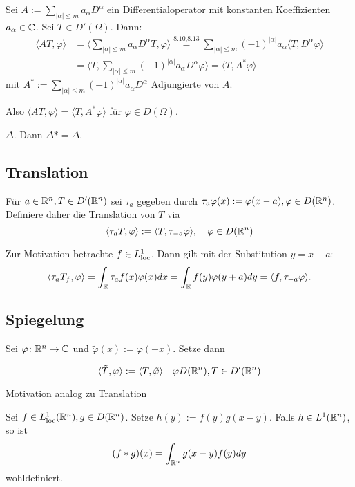 Sei $A := \sum_{|\alpha| \leq m} a_\alpha D^\alpha$ ein Differentialoperator mit konstanten Koeffizienten $a_\alpha \in \mathbb{C}$.
Sei $T \in D'(\Omega)$. Dann:
\begin{align*}
  \langle AT, \varphi \rangle
  &= \langle \sum_{|\alpha| \leq m} a_\alpha D^\alpha T, \varphi \rangle
  \overset{\text{8.10,8.13}}{=} \sum_{|\alpha| \leq m} (-1)^{|\alpha|} a_\alpha \langle T, D^\alpha \varphi \rangle \\
  &= \langle T, \sum_{|\alpha| \leq m} (-1)^{|\alpha|} a_\alpha D^\alpha \varphi \rangle 
  = \langle T, A^* \varphi \rangle
\end{align*}
mit $A^* := \sum_{|\alpha| \leq m} (-1)^{|\alpha|} a_\alpha D^\alpha$ \underline{Adjungierte von $A$}.

Also $\langle AT, \varphi \rangle = \langle T, A^* \varphi \rangle$ für $\varphi \in D(\Omega)$.

\begin{ex}
  $\Delta$. Dann $\Delta* = \Delta$.
\end{ex}

\subsection{Translation}

Für $a \in \mathbb{R}^n, T \in D'(\mathbb{R}^n)$ sei $\tau_a$ gegeben durch $\tau_a \varphi(x) := \varphi(x - a), \varphi \in D(\mathbb{R}^n)$.
Definiere daher die \underline{Translation von $T$} via
$$
\langle \tau_a T, \varphi \rangle := \langle T, \tau_{-a} \varphi \rangle, \quad \varphi \in D(\mathbb{R}^n)
$$

{\tiny{
  Zur Motivation betrachte $f \in L^1_{\operatorname{loc}}$. Dann gilt mit der Substitution $y = x - a$:
  $$
  \langle \tau_a T_f, \varphi \rangle = \int_{\mathbb{R}} \tau_a f(x) \varphi(x) dx = \int_{\mathbb{R}} f(y) \varphi(y + a) dy = \langle f, \tau_{-a} \varphi \rangle.
  $$
  }
}

\subsection{Spiegelung}

Sei  $\varphi \colon \mathbb{R}^n \to \mathbb{C}$ und $\tilde\varphi(x) := \varphi(-x)$.
Setze dann 

$$\langle \tilde T, \varphi \rangle := \langle T, \tilde \varphi\rangle \quad \varphi D(\mathbb{R}^n), T \in D'(\mathbb{R}^n)$$

{\tiny{Motivation analog zu Translation}}

Sei $f \in L^1_{\operatorname{loc}}(\mathbb{R}^n), g \in D(\mathbb{R}^n)$.
Setze $h(y) := f(y)g(x-y)$.
Falls $h \in L^1(\mathbb{R}^n)$, so ist
$$
(f \ast g)(x) = \int_{\mathbb{R}^n} g(x - y)f(y) dy
$$
wohldefiniert.

